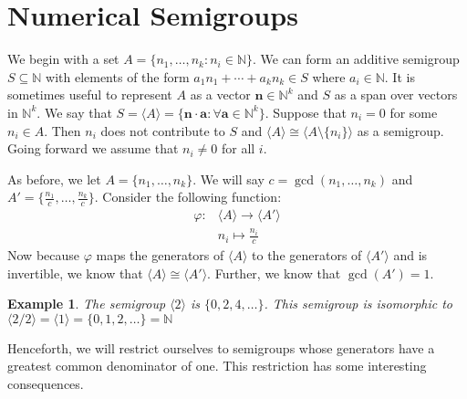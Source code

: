 \documentclass[11pt]{amsart}
\theoremstyle{plain}
\newtheorem{exa}{Example}
\theoremstyle{definition}
\begin{document}
\section{Numerical Semigroups}

We begin with a set $A=\{n_1,\dots,n_k:n_i\in \mathbb{N}\}$. We can form an
additive semigroup $S\subseteq \mathbb{N}$ with elements of the form
$a_1n_1+\cdots+{a_k}n_k\in S$ where $a_i\in \mathbb{N}$. It is sometimes useful
to represent $A$ as a vector $\mathbf{n}\in \mathbb{N}^k$ and $S$ as a span over vectors in $\mathbb{N}^k$. We say that $S=\langle A\rangle=\{\mathbf{n}\cdot\mathbf{a}:
\forall\mathbf{a}\in \mathbb{N}^k\}$. Suppose that $n_i=0$ for some $n_i\in A$.
Then $n_i$ does not contribute to $S$ and $\langle A\rangle \cong \langle
A\setminus \{n_i\}\rangle$ as a semigroup. Going forward we assume that
$n_i\ne 0$ for all $i$.

As before, we let $A=\{n_1,\dots,n_k\}$. We will say $c=\gcd(n_1,\dots,n_k)$ and
$A'=\{\frac{n_1}{c},\dots,\frac{n_k}{c}\}$. Consider the following function:
\begin{align*}
  \varphi:&\langle A\rangle \to \langle A'\rangle\\
  &n_i\mapsto \frac{n_i}{c}
\end{align*}
Now because $\varphi$ maps the generators of $\langle A\rangle$ to the generators
of $\langle A'\rangle$ and is invertible, we know that $\langle A\rangle \cong
\langle A'\rangle $. Further, we know that $\gcd(A')=1$.
\begin{exa}
  The semigroup $\langle2\rangle$ is $\{0,2,4,\dots \}$. This semigroup is isomorphic to $\langle 2/2\rangle=\langle1\rangle=\{0,1,2,\dots\}=\mathbb{N}$
\end{exa}

Henceforth, we will
restrict ourselves to semigroups whose generators have a greatest common
denominator of one. This restriction has some interesting consequences.
\end{document}
